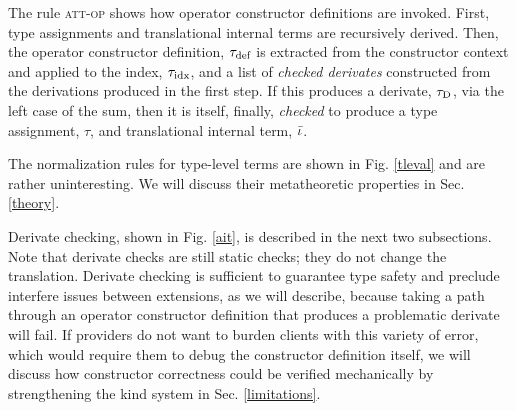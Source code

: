 \documentclass[9pt,preprint]{sigplanconf}
\begin{document}
 The rule \textsc{att-op} shows how operator constructor definitions are invoked. First, type assignments  and translational internal terms are recursively derived. Then, the operator constructor definition, ${\tau_{\text{def}}}$ is extracted from the constructor context and applied to the index, ${\tau_{\text{idx}}}$, and a list of \emph{checked derivates} constructed from the derivations produced in the first step. If this produces a derivate, ${\tau_{\text{D}}}$, via the left case of the sum, then it is itself, finally, \emph{checked} to produce a type assignment, $\tau$, and translational internal term, ${\bar \iota}$. 
 
The normalization rules for type-level terms are shown in Fig. \ref{tleval} and are rather uninteresting. We will discuss their metatheoretic properties in Sec. \ref{theory}.
 
 Derivate checking, shown in Fig. \ref{ait}, is described in the next two subsections. 
 Note that derivate checks are still static checks; they do not change the translation. Derivate checking is sufficient to guarantee type safety and preclude interfere issues between extensions, as we will describe, because taking a path through an operator constructor definition that produces a problematic derivate will fail. If providers do not want to burden clients with this variety of error, which would require them to debug the constructor definition itself, we will discuss how constructor correctness could be verified mechanically by strengthening the kind system in Sec. \ref{limitations}. %

\end{document}
